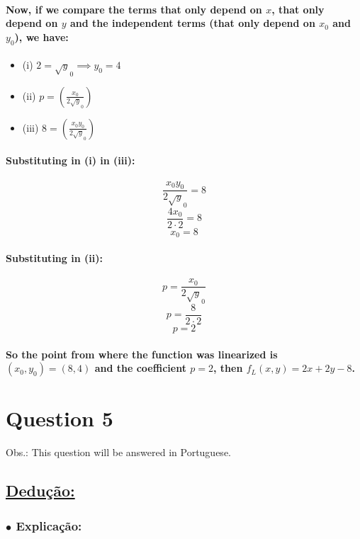 \documentclass[a4paper]{article}    %
\begin{document}
    \paragraph{Now, if we compare the terms that only depend on $x$, that only depend on $y$ and the independent terms (that only depend on $x_0$ and $y_0$), we have:}
\begin{itemize}
    \item (i)   $ 2 = \sqrt y_0 \implies \boxed{y_0 = 4}$ 
    \item (ii)  $ p = \left(\frac{x_0}{2\sqrt y_0}\right) $
    \item (iii) $ 8 = \left(\frac{x_0 y_0}{2\sqrt y_0}\right) $
\end{itemize}

\paragraph{Substituting in (i) in (iii):}
    \[\frac{x_0 y_0}{2\sqrt y_0} = 8\]
    \[\frac{4 x_0}{2\cdot2} = 8\]
    \[\boxed{x_0 = 8}\]

\paragraph{Substituting in (ii):}
    \[p = \frac{x_0}{2\sqrt y_0}\]
    \[p = \frac{8}{2\cdot2}\]
    \[\boxed{p = 2}\]

    \paragraph{So the point from where the function was linearized is $(x_0,y_0) = (8,4)$ and the coefficient $p = 2$, then $f_L(x,y) = 2x + 2y -8$.}

\newpage
 
\section*{Question 5}
\addtocounter{section}{1}
Obs.: This question will be answered in Portuguese.

\subsection*{\underline{Dedução:}}

\subsubsection*{\hspace{5mm}$\bullet$ Explicação:}
\end{document}
